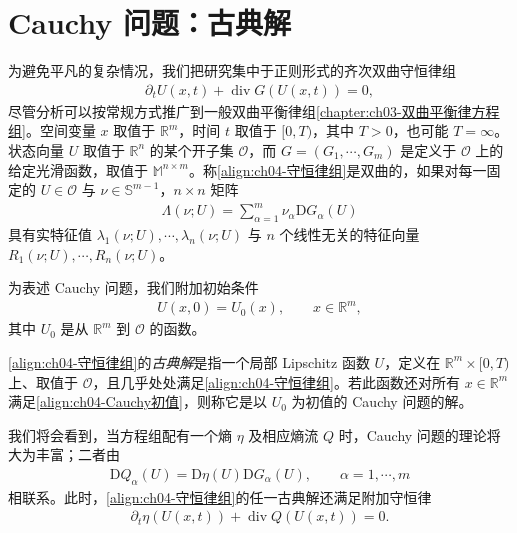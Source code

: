 ﻿\documentclass[../../main.tex]{subfiles}
\begin{document}
\section{Cauchy 问题：古典解}\label{section:ch04-经典解}

为避免平凡的复杂情况，我们把研究集中于正则形式的齐次双曲守恒律组
\begin{align}
\partial_t U(x,t)+\operatorname{div}G(U(x,t))=0,
\label{align:ch04-守恒律组}
\end{align}
尽管分析可以按常规方式推广到一般双曲平衡律组\cref{chapter:ch03-双曲平衡律方程组}。空间变量 $x$ 取值于 $\mathbb{R}^{m}$，时间 $t$ 取值于 $[0,T)$，其中 $T>0$，也可能 $T=\infty$。状态向量 $U$ 取值于 $\mathbb{R}^{n}$ 的某个开子集 $\mathcal{O}$，而 $G=(G_{1},\cdots,G_{m})$ 是定义于 $\mathcal{O}$ 上的给定光滑函数，取值于 $\mathbb{M}^{n\times m}$。称\eqref{align:ch04-守恒律组}是双曲的，如果对每一固定的 $U\in\mathcal{O}$ 与 $\nu\in\mathbb{S}^{m-1}$，$n\times n$ 矩阵
\begin{align}
\Lambda(\nu;U)=\sum_{\alpha=1}^{m}\nu_{\alpha}\mathrm{D}G_{\alpha}(U)
\label{align:ch04-方向矩阵}
\end{align}
具有实特征值 $\lambda_{1}(\nu;U),\cdots,\lambda_{n}(\nu;U)$ 与 $n$ 个线性无关的特征向量 $R_{1}(\nu;U),\cdots,R_{n}(\nu;U)$。

为表述 Cauchy 问题，我们附加初始条件
\begin{align}
U(x,0)=U_{0}(x),\qquad x\in\mathbb{R}^{m},
\label{align:ch04-Cauchy初值}
\end{align}
其中 $U_{0}$ 是从 $\mathbb{R}^{m}$ 到 $\mathcal{O}$ 的函数。

\eqref{align:ch04-守恒律组}的\emph{古典解}是指一个局部 Lipschitz 函数 $U$，定义在 $\mathbb{R}^{m}\times[0,T)$ 上、取值于 $\mathcal{O}$，且几乎处处满足\eqref{align:ch04-守恒律组}。若此函数还对所有 $x\in\mathbb{R}^{m}$ 满足\eqref{align:ch04-Cauchy初值}，则称它是以 $U_{0}$ 为初值的 Cauchy 问题的解。

我们将会看到，当方程组配有一个熵 $\eta$ 及相应熵流 $Q$ 时，Cauchy 问题的理论将大为丰富；二者由
\begin{align}
\mathrm{D}Q_{\alpha}(U)=\mathrm{D}\eta(U)\mathrm{D}G_{\alpha}(U),\qquad \alpha=1,\cdots,m
\label{align:ch04-熵流关系}
\end{align}
相联系。此时，\eqref{align:ch04-守恒律组}的任一古典解还满足附加守恒律
\begin{align}
\partial_{t}\eta(U(x,t))+\operatorname{div}Q(U(x,t))=0.
\label{align:ch04-熵守恒}
\end{align}
\end{document}
